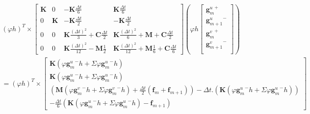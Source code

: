 \documentclass[12pt,a4paper]{report}
\begin{document}
\begin{equation}
\!\!\!\!\!\!\!\!\!\!\!\!\!\!\!\!\!
\begin{array}{c}
	(\varphi h)^T \times
		\begin{bmatrix}   
		   		\mathbf{K}
			&
		   		0
		   	&
			   	-\mathbf{K} \frac{\Delta t}{6} 
		   	&
		   		\mathbf{K} \frac{\Delta t}{6} 
		\\ 	     
			   0 
			&
				\mathbf{K} 
		   	&
		   		-\mathbf{K} \frac{\Delta t}{2} 
		   	&
		   		-\mathbf{K} \frac{\Delta t}{2}
		\\   
		   		0
		   	& 
		   		0
		   	&
			   	\mathbf{K}
			   		\frac{(\Delta t)^2}{3} 
		   		+\mathbf{C} \frac{\Delta t}{2}
		   	&
		   		\mathbf{K} \frac{(\Delta t)^2}{6} 
		   		+\mathbf{M} 
			   	+\mathbf{C} \frac{\Delta t}{2}
		\\    
		   		0
		   	&
		   		0
		   	&
		   		\mathbf{K} \frac{(\Delta t)^2}{12}
		   		-\mathbf{M}
			   		\frac{1}{2} 
		   	&
		   		\mathbf{K} \frac{(\Delta t)^2}{12}
		   		+\mathbf{M} \frac{1}{6} 
			   +\mathbf{C} \frac{\Delta t}{6} 
	\end{bmatrix}
	\left(
		\varphi h \begin{bmatrix}
		   {\mathbf{g}^u_m}^+  		\\
		   {\mathbf{g}^u_{m+1}}^-  	\\
		   {\mathbf{g}^v_m}^+  		\\
		   {\mathbf{g}^v_{m+1}}^-  	\\
		\end{bmatrix}
	\right)
	\\ =	
			(\varphi h)^T \times
	\begin{bmatrix}	
		  \mathbf{K} (\varphi {\mathbf{g}^u_m}^- h + \Sigma \varphi {\mathbf{g}^u_m}^- h)
		\\ \mathbf{K} (\varphi {\mathbf{g}^u_m}^- h + \Sigma \varphi {\mathbf{g}^u_m}^- h)
		\\ 	\left( \mathbf{M}  (\varphi {\mathbf{g}^v_m}^- h + \Sigma \varphi {\mathbf{g}^v_m}^- h)
		     			+\frac{\Delta t}{2}  (\mathbf{f}_m + \mathbf{f}_{m+1})
			  \right)
			-\Delta t.
			 \left( \mathbf{K}  (\varphi {\mathbf{g}^u_m}^- h + \Sigma \varphi{\mathbf{g}^u_m}^- h)
			  \right)
		\\-\frac{\Delta t}{6}
				\left( \mathbf{K}  (\varphi {\mathbf{g}^u_m}^- h + \Sigma \varphi {\mathbf{g}^u_m}^- h)
						-\mathbf{f}_{m+1}
				\right)
					  

\end{bmatrix}
\end{array}
\end{equation}
\end{document}
